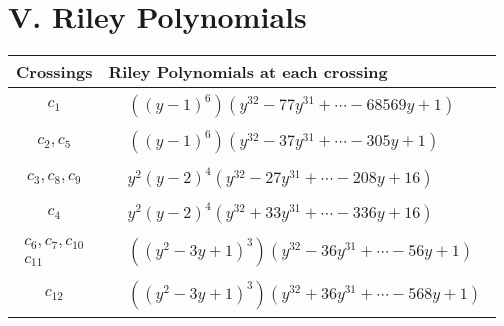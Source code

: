 \documentclass[1p]{elsarticle_modified}
\theoremstyle{definition}
\begin{document}
\centering \section*{ V. Riley Polynomials}
\begin{tabular}{m{50pt}|m{274pt}}
Crossings & \hspace{64pt}Riley Polynomials at each crossing \\
\hline $$\begin{aligned}c_{1}\end{aligned}$$&$\begin{aligned}
&((y-1)^6)(y^{32}-77 y^{31}+\cdots-68569 y+1)
\end{aligned}$\\
\hline $$\begin{aligned}c_{2},c_{5}\end{aligned}$$&$\begin{aligned}
&((y-1)^6)(y^{32}-37 y^{31}+\cdots-305 y+1)
\end{aligned}$\\
\hline $$\begin{aligned}c_{3},c_{8},c_{9}\end{aligned}$$&$\begin{aligned}
&y^2(y-2)^4(y^{32}-27 y^{31}+\cdots-208 y+16)
\end{aligned}$\\
\hline $$\begin{aligned}c_{4}\end{aligned}$$&$\begin{aligned}
&y^2(y-2)^4(y^{32}+33 y^{31}+\cdots-336 y+16)
\end{aligned}$\\
\hline $$\begin{aligned}c_{6},c_{7},c_{10}\\c_{11}\end{aligned}$$&$\begin{aligned}
&((y^2-3 y+1)^3)(y^{32}-36 y^{31}+\cdots-56 y+1)
\end{aligned}$\\
\hline $$\begin{aligned}c_{12}\end{aligned}$$&$\begin{aligned}
&((y^2-3 y+1)^3)(y^{32}+36 y^{31}+\cdots-568 y+1)
\end{aligned}$\\
\hline
\end{tabular}
\vskip 2pc
\end{document}
